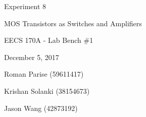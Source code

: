 \begin{titlepage}
	\centering
	\vspace{2.5cm}
	\vspace{1cm}
	{\huge Experiment 8 \par}
	{\LARGE MOS Transistors as Switches and Amplifiers \par}
	{\Large EECS 170A - Lab Bench \#1 \par}
	{\Large December 5, 2017 \par}
	\vspace{1cm}
	{\large Roman Parise (59611417) \par}
	{\large Krishan Solanki (38154673) \par}
	{\large Jason Wang (42873192) \par}
	\vspace{1cm}
\end{titlepage}



